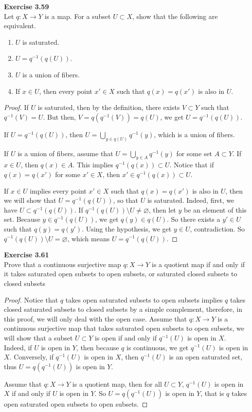 \documentclass[12pt, a4paper]{article}
\theoremstyle{plain}
\newenvironment{exercise}[2][Exercise]
    { \begin{mdframed}[backgroundcolor=gray!20] \textbf{#1 #2} \\}
    {  \end{mdframed}}
\begin{document}
\begin{exercise}{3.59}
Let $q:X\rightarrow Y$ is a map. For a subset $U\subset X$, show that the following are equivalent.
\begin{enumerate}[label=(\alph*)]
\item $U$ is saturated.
\item $U=q^{-1}(q(U))$.
\item $U$ is a union of fibers.
\item If $x\in U$, then every point $x'\in X$ such that $q(x)=q(x')$ is also in $U$.
\end{enumerate}
\end{exercise}
	\begin{proof}
	\hfill
	
	If $U$ is saturated, then by the definition, there exists $V\subset Y$ such that $q^{-1}(V)=U$. But then, $V=q(q^{-1}(V))=q(U)$, we get $U=q^{-1}(q(U))$.
	
	If $U=q^{-1}(q(U))$, then $U=\bigcup_{y\in q(U)}q^{-1}(y)$, which is a union of fibers.
	
	If $U$ is a union of fibers, assume that $U=\bigcup_{y\in A}q^{-1}(y)$ for some set $A\subset Y$. If $x\in U$, then $q(x)\in A$. This implies $q^{-1}(q(x))\subset U$. Notice that if $q(x)=q(x')$ for some $x'\in X$, then $x'\in q^{-1}(q(x))\subset U$.
	
	If $x\in U$ implies every point $x'\in X$ such that $q(x)=q(x')$ is also in $U$, then we will show that $U=q^{-1}(q(U))$, so that $U$ is saturated. Indeed, first, we have $U\subset q^{-1}(q(U))$. If $q^{-1}(q(U))\setminus U\neq \varnothing$, then let $y$ be an element of this set. Because $y\in q^{-1}(q(U))$, we get $q(y)\in q(U)$. So there exists a $y'\in U$ such that $q(y)=q(y')$. Using the hypothesis, we get $y\in U$, contradiction. So $q^{-1}(q(U))\setminus U= \varnothing$, which means $U=q^{-1}(q(U))$.
	\end{proof}
	
\begin{exercise}{3.61}
Prove that a continuous surjective map $q:X\rightarrow Y$ is a quotient map if and only if it takes saturated open subsets to open subsets, or saturated closed subsets to closed subsets
\end{exercise}
	\begin{proof}
	Notice that $q$ takes open saturated subsets to open subsets implies $q$ takes closed saturated subsets to closed subsets by a simple complement, therefore, in this proof, we will only deal with the open case. Assume that $q:X\rightarrow Y$ is a continuous surjective map that takes saturated open subsets to open subsets, we will show that a subset $U\subset Y$ is open if and only if $q^{-1}(U)$ is open in $X$. Indeed, if $U$ is open in $Y$, then because $q$ is continuous, we get $q^{-1}(U)$ is open in $X$. Conversely, if $q^{-1}(U)$ is open in $X$, then $q^{-1}(U)$ is an open saturated set, thus $U=q(q^{-1}(U))$ is open in $Y$.
	
	Assume that $q:X\rightarrow Y$ is a quotient map, then for all $U\subset Y$, $q^{-1}(U)$ is open in $X$ if and only if $U$ is open in $Y$. So $U=q(q^{-1}(U))$ is open in $Y$, that is $q$ takes open saturated open subsets to open subsets.
	\end{proof}
	
\end{document}
